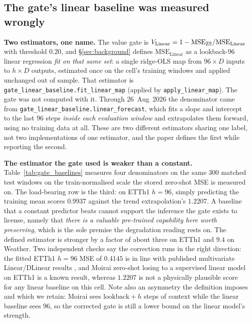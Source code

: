 \subsection{The gate's linear baseline was measured wrongly}
\label{app:gatecorrection}

\textbf{Two estimators, one name.} The value gate is
$V_{\text{Linear}} = 1 - \text{MSE}_\text{ZS}/\text{MSE}_\text{Linear}$
with threshold $0.20$, and \S\ref{sec:background} defines
$\text{MSE}_\text{Linear}$ as a lookback-96 linear regression \emph{fit on that
same set}: a single ridge-OLS map from $96{\times}D$ inputs to $h{\times}D$
outputs, estimated once on the cell's training windows and applied unchanged
out of sample. That estimator is
\texttt{gate\_linear\_baseline.fit\_linear\_map} (applied by
\texttt{apply\_linear\_map}). The gate was not computed with it. Through
26~Aug~2026 the denominator came from
\texttt{gate\_linear\_baseline.linear\_forecast}, which fits a slope and
intercept to the last 96 steps \emph{inside each evaluation window} and
extrapolates them forward, using no training data at all. These are two
different estimators sharing one label, not two implementations of one
estimator, and the paper defines the first while reporting the second.

\textbf{The estimator the gate used is weaker than a constant.}
Table~\ref{tab:gate_baselines} measures four denominators on the same 300
matched test windows on the train-normalised scale the stored zero-shot MSE is
measured on. The load-bearing row is the third: on ETTh1 $h{=}96$, simply
predicting the training mean scores $0.9937$ against the trend
extrapolation's $1.2207$. A baseline that a constant predictor beats cannot
support the inference the gate exists to license, namely that \emph{there is a
valuable pre-trained capability here worth preserving}, which is the sole
premise the degradation reading rests on. The defined estimator is stronger by
a factor of about three on ETTh1 and $9.4$ on Weather. Two independent checks
say the correction runs in the right direction: the fitted ETTh1 $h{=}96$ MSE
of $0.4145$ is in line with published multivariate Linear/DLinear results
\cite{zeng2023transformers}, and Moirai zero-shot losing to a supervised
linear model on ETTh1 is a known result, whereas $1.2207$ is not a physically
plausible score for any linear baseline on this cell. Note also an asymmetry
the definition imposes and which we retain: Moirai sees $\text{lookback}+h$
steps of context while the linear baseline sees $96$, so the corrected gate is
still a lower bound on the linear model's strength.

